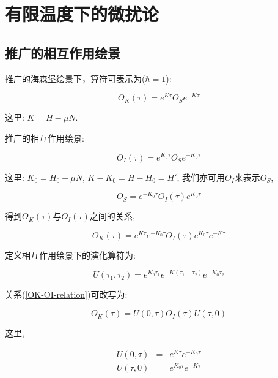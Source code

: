 \section{有限温度下的微扰论}

\subsection{推广的相互作用绘景}

推广的海森堡绘景下，算符可表示为($\hbar = 1$):

\begin{equation*}
O_K (\tau) = e^{K \tau} O_S e^{-K \tau}
\end{equation*}

这里: $K = H - \mu N$.


推广的相互作用绘景:

\begin{equation*}
O_I (\tau ) = e^{K_0 \tau} O_S e^{-K_0 \tau}
\end{equation*}

这里: $K_0 = H_0 - \mu N$, $K- K_0 = H - H_0 = H'$,
我们亦可用$O_I$来表示$O_S$,

\begin{equation*}
O_S = e^{-K_0 \tau} O_I (\tau) e^{K_0 \tau}
\end{equation*}

得到$O_K (\tau)$与$O_I (\tau)$之间的关系,

\begin{equation}\label{OK-OI-relation}
O_K(\tau) = e^{K \tau} e^{-K_0 \tau} O_I (\tau) e^{K_0 \tau}
e^{-K\tau}
\end{equation}

定义相互作用绘景下的演化算符为:

\begin{equation*}
U(\tau_1, \tau_2) = e^{K_0 \tau_1} e^{-K(\tau_1 - \tau_2)} e^{-K_0
\tau_2}
\end{equation*}

关系(\ref{OK-OI-relation})可改写为:

\begin{equation*}
O_K (\tau) = U(0, \tau) O_I (\tau) U(\tau, 0)
\end{equation*}

这里,

\begin{eqnarray*}
  U(0,\tau) &=& e^{K\tau}e^{-K_0\tau} \\
  U(\tau,0) &=& e^{K_0 \tau} e^{-K\tau}
\end{eqnarray*}

